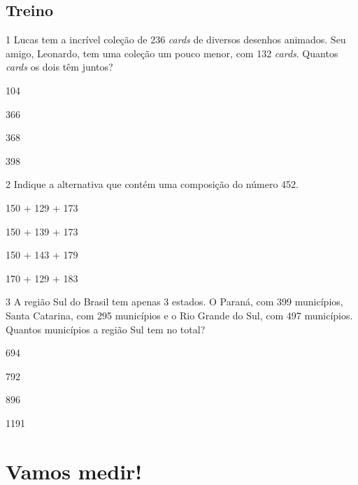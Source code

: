 
\pagebreak
\section*{Treino}

\num{1} Lucas tem a incrível coleção de 236 \emph{cards} de diversos desenhos
animados. Seu amigo, Leonardo, tem uma coleção um pouco menor, com 132
\emph{cards}. Quantos \emph{cards} os dois têm juntos?

\begin{escolha}[itemsep=-5pt]
\item 104

\item 366

\item 368

\item 398
\end{escolha}

\num{2} Indique a alternativa que contém uma composição do número 452.

\begin{escolha}[itemsep=-5pt]
\item 150 + 129 + 173

\item 150 + 139 + 173

\item 150 + 143 + 179

\item 170 + 129 + 183
\end{escolha}


\num{3} A região Sul do Brasil tem apenas 3 estados. O Paraná, com 399
municípios, Santa Catarina, com 295 municípios e o Rio Grande do Sul, com
497 municípios. Quantos municípios a região Sul tem no total?

\begin{escolha}[itemsep=-5pt]
\item 694

\item 792

\item 896

\item 1191
\end{escolha}

\chapter{Vamos medir!}

